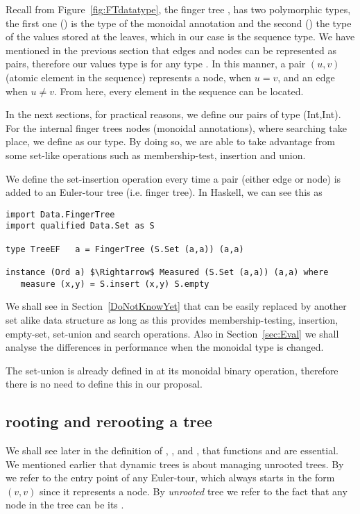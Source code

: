Recall from Figure~\ref{fig:FTdatatype}, the finger tree , has two polymorphic types, the first one () is the type of the monoidal annotation and the second () the type of the values stored at the leaves, which in our case is the sequence type. We have mentioned in the previous section that edges and nodes can be represented as pairs, therefore our values type is  for any type . In this manner, a pair $(u,v)$ (atomic element in the sequence) represents a node, when $u = v$, and an edge when $u \neq v$. From here, every element in the sequence  can be located.

In the next sections, for practical reasons, we define our pairs of type \code(Int,Int). For the internal finger trees nodes (monoidal annotations), where searching take place, we define  as our type. By doing so, we are able to take advantage from some set-like operations such as membership-test, insertion and union. 

We define the set-insertion operation every time a pair (either edge or node) is added to an Euler-tour tree (i.e. finger tree). In Haskell, we can see this as
\begin{lstlisting}[mathescape]
import Data.FingerTree
import qualified Data.Set as S

type TreeEF   a = FingerTree (S.Set (a,a)) (a,a)

instance (Ord a) $\Rightarrow$ Measured (S.Set (a,a)) (a,a) where 
   measure (x,y) = S.insert (x,y) S.empty 
\end{lstlisting} 

We shall see in Section~\ref{DoNotKnowYet} that  can be easily replaced by another set alike data structure as long as this provides membership-testing, insertion, empty-set, set-union and search operations. Also in Section~\ref{sec:Eval} we shall analyse the differences in performance when the monoidal type is changed.

The set-union is already defined in  at its monoidal binary operation, therefore there is no need to define this in our proposal.


\subsection{rooting and rerooting a tree}
We shall see later in the definition of \link,  \cut, and \connected, that functions \root and \reroot are essential. We mentioned earlier that dynamic trees is about managing unrooted trees. By \root we refer to the entry point of any Euler-tour, which always starts in the form $(v,v)$ since it represents a node. By \emph{unrooted} tree we refer to the fact that any node in the tree can be its \root.

